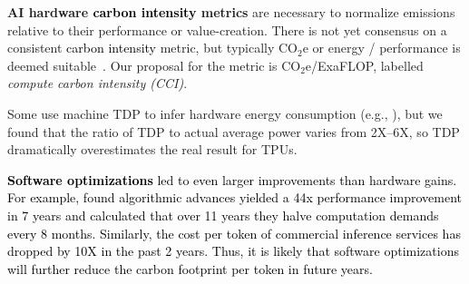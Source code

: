 \textbf{AI hardware \textcolor{black}{carbon intensity} metrics} are necessary to normalize emissions relative to their performance or value-creation. There is not yet consensus on a consistent \textcolor{black}{carbon intensity} metric, but typically CO$_{2}$e or energy / performance is deemed suitable~\citep{Jouppi2023,Vahdat2024}. Our proposal for the metric is CO$_{2}$e/ExaFLOP, labelled \textit{compute carbon intensity (CCI)}.

Some use machine TDP to infer hardware energy consumption (e.g., \citep{bouza2023estimate,lannelongue2021green,trebaol2020cumulator}), but we found that the ratio of TDP to actual average power varies from 2X--6X, so TDP dramatically overestimates the real result for TPUs.

\textcolor{black}{\textbf{Software optimizations} led to even larger improvements than hardware gains. For example, \citet{hernandez2020measuring} found algorithmic advances yielded a 44x performance improvement in 7 years and \citet{ho2024algorithmic} calculated that over 11 years they halve computation demands every 8 months. Similarly, the cost per token of commercial inference services has dropped by 10X in the past 2 years. Thus, it is likely that software optimizations will further reduce the carbon footprint per token in future years.}